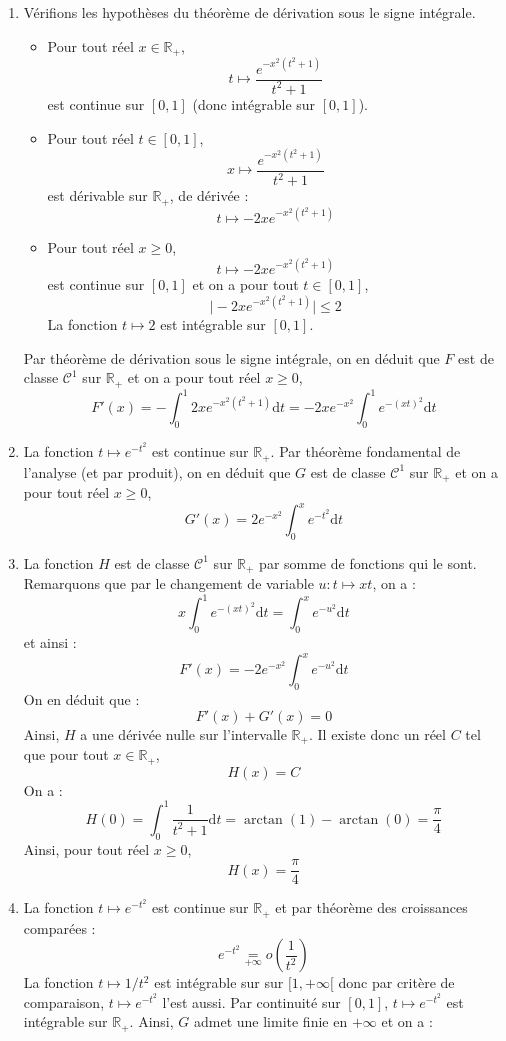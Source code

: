 \documentclass[a4paper,twoside,french,11pt]{VcCours}
\newcommand{\dt}{\text{d}t}
\begin{document}
\begin{enumerate}
\item Vérifions les hypothèses du théorème de dérivation sous le signe intégrale.
\begin{itemize}
\item Pour tout réel $x \in \mathbb{R}_+$, 
$$ t \mapsto \frac{e^{-x^2(t^2+1)}}{t^2+1}$$
est continue sur $[0,1]$ (donc intégrable sur $[0,1]$).
\item Pour tout réel $t \in [0,1]$,
$$ x \mapsto \frac{e^{-x^2(t^2+1)}}{t^2+1}$$
est dérivable sur $\mathbb{R}_+$, de dérivée :
$$ t \mapsto - 2xe^{-x^2(t^2+1)}$$
\item Pour tout réel $x \geq 0$,
$$ t \mapsto - 2xe^{-x^2(t^2+1)} $$
est continue sur $[0,1]$ et on a pour tout $t \in [0,1]$,
$$ \vert  - 2xe^{-x^2(t^2+1)} \vert \leq 2$$
La fonction $t \mapsto 2$ est intégrable sur $[0,1]$.
\end{itemize}
Par théorème de dérivation sous le signe intégrale, on en déduit que $F$ est de classe $\mathcal{C}^1$ sur $\mathbb{R}_+$ et on a pour tout réel $x \geq 0$,
$$ F'(x) = - \int_0^1 2x e^{-x^2(t^2+1)} \dt = - 2xe^{-x^2} \int_0^1  e^{-(xt)^2} \dt$$
\item La fonction $t \mapsto e^{-t^2}$ est continue sur $\mathbb{R}_+$. Par théorème fondamental de l'analyse (et par produit), on en déduit que $G$ est de classe $\mathcal{C}^1$ sur $\mathbb{R}_+$ et on a pour tout réel $x \geq 0$,
$$ G'(x) = 2 e^{-x^2} \int_0^x e^{-t^2} \dt$$
\item La fonction $H$ est de classe $\mathcal{C}^1$ sur $\mathbb{R}_+$ par somme de fonctions qui le sont. Remarquons que par le changement de variable $  u : t \mapsto xt$, on a :
$$ x\int_0^1  e^{-(xt)^2} \dt = \int_0^x  e^{-u^2} \dt$$ 
et ainsi :
$$ F'(x) = -2e^{-x^2} \int_0^x  e^{-u^2} \dt$$ 
On en déduit que :
$$ F'(x)+G'(x) = 0$$
Ainsi, $H$ a une dérivée nulle sur l'intervalle $\mathbb{R}_+$. Il existe donc un réel $C$ tel que pour tout $x \in \mathbb{R}_+$,
$$ H(x) = C$$
On a :
$$ H(0) = \int_{0}^1 \frac{1}{t^2+1} \dt = \arctan(1) - \arctan(0) = \dfrac{\pi}{4}$$
Ainsi, pour tout réel $x \geq 0$,
$$ H(x) = \dfrac{\pi}{4}$$
\item La fonction $t \mapsto e^{-t^2}$ est continue sur $\mathbb{R}_+$ et par théorème des croissances comparées :
$$ e^{-t^2} \underset{+ \infty}{=} o \left( \dfrac{1}{t^2} \right)$$
La fonction $t \mapsto 1/t^2$ est intégrable sur sur $[1, + \infty[$ donc par critère de comparaison, $t \mapsto e^{-t^2}$ l'est aussi. Par continuité sur $[0,1]$, $t \mapsto e^{-t^2}$ est intégrable sur $\mathbb{R}_+$. Ainsi, $G$ admet une limite finie en $+ \infty$ et on a :

\end{enumerate}
\end{document}
